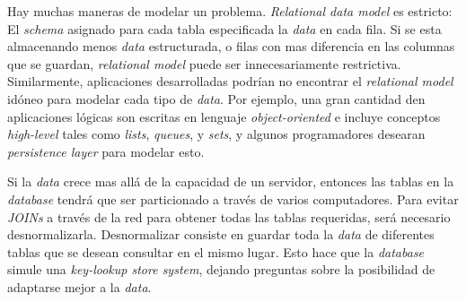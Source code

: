 Hay muchas maneras de modelar un problema. \textit{Relational data model} es estricto: El \textit{schema} asignado para cada tabla especificada la \textit{data} en cada fila. Si se esta almacenando menos \textit{data} estructurada, o filas con mas diferencia en las columnas que se guardan, \textit{relational model} puede ser innecesariamente restrictiva. Similarmente, aplicaciones desarrolladas podrían no encontrar el \textit{relational model} idóneo para modelar cada tipo de \textit{data}. Por ejemplo, una gran cantidad den aplicaciones lógicas son escritas en lenguaje \textit{object-oriented} e incluye conceptos \textit{high-level} tales como \textit{lists}, \textit{queues}, y \textit{sets}, y algunos programadores desearan \textit{persistence layer} para modelar esto.

Si la \textit{data} crece mas allá de la capacidad de un servidor, entonces las tablas en la \textit{database} tendrá que ser particionado a través de varios computadores. Para evitar \textit{JOINs} a través de la red para obtener todas las tablas requeridas, será necesario desnormalizarla. Desnormalizar consiste en guardar toda la \textit{data} de diferentes tablas que se desean consultar en el mismo lugar. Esto hace que la \textit{database} simule una \textit{key-lookup store system}, dejando preguntas sobre la posibilidad de adaptarse mejor a la \textit{data}.

